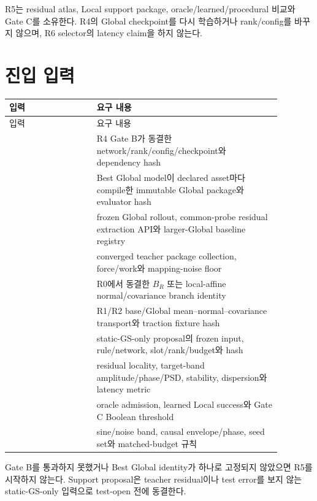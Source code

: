 \documentclass[10pt,a4paper]{article}
\begin{document}
R5는 residual atlas, Local support package, oracle/learned/procedural 비교와 Gate C를 소유한다.
R4의 Global checkpoint를 다시 학습하거나 rank/config를 바꾸지 않으며, R6 selector의 latency claim을 하지 않는다.

\section{진입 입력}
\label{sec:r5-chapter-2}

\begin{longtable}{L{0.29\linewidth}L{0.59\linewidth}}
\toprule
입력 & 요구 내용\\
\midrule
\endfirsthead
\toprule
입력 & 요구 내용\\
\midrule
\endhead
{} & R4 Gate B가 동결한 network/rank/config/checkpoint와 dependency hash\\
 & Best Global model이 declared asset마다 compile한 immutable Global package와 evaluator hash\\
 & frozen Global rollout, common-probe residual extraction API와 larger-Global baseline registry\\
 & converged teacher package collection, force/work와 mapping-noise floor\\
 & R0에서 동결한 \(B_R\) 또는 local-affine normal/covariance branch identity\\
 & R1/R2 base/Global mean--normal--covariance transport와 traction fixture hash\\
 & static-GS-only proposal의 frozen input, rule/network, slot/rank/budget와 hash\\
 & residual locality, target-band amplitude/phase/PSD, stability, dispersion와 latency metric\\
 & oracle admission, learned Local success와 Gate C Boolean threshold\\
 & sine/noise band, causal envelope/phase, seed set와 matched-budget 규칙\\
\bottomrule
\end{longtable}

Gate B를 통과하지 못했거나 Best Global identity가 하나로 고정되지 않았으면 R5를 시작하지 않는다.
Support proposal은 teacher residual이나 test error를 보지 않는 static-GS-only 입력으로 test-open 전에 동결한다.
\end{document}
